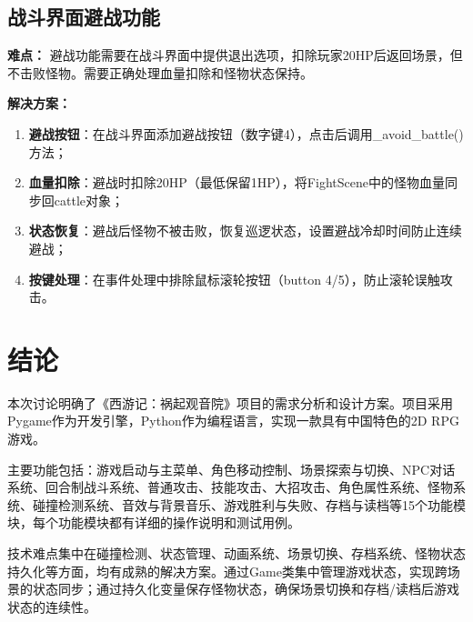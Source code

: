 \documentclass[a4paper,12pt]{article}
\begin{document}
\subsection{战斗界面避战功能}

\textbf{难点：}
避战功能需要在战斗界面中提供退出选项，扣除玩家20HP后返回场景，但不击败怪物。需要正确处理血量扣除和怪物状态保持。

\textbf{解决方案：}
\begin{enumerate}[label=(\arabic*)]
    \item \textbf{避战按钮}：在战斗界面添加避战按钮（数字键4），点击后调用\_avoid\_battle()方法；
    \item \textbf{血量扣除}：避战时扣除20HP（最低保留1HP），将FightScene中的怪物血量同步回cattle对象；
    \item \textbf{状态恢复}：避战后怪物不被击败，恢复巡逻状态，设置避战冷却时间防止连续避战；
    \item \textbf{按键处理}：在事件处理中排除鼠标滚轮按钮（button 4/5），防止滚轮误触攻击。
\end{enumerate}

\section{结论}

本次讨论明确了《西游记：祸起观音院》项目的需求分析和设计方案。项目采用Pygame作为开发引擎，Python作为编程语言，实现一款具有中国特色的2D RPG游戏。

主要功能包括：游戏启动与主菜单、角色移动控制、场景探索与切换、NPC对话系统、回合制战斗系统、普通攻击、技能攻击、大招攻击、角色属性系统、怪物系统、碰撞检测系统、音效与背景音乐、游戏胜利与失败、存档与读档等15个功能模块，每个功能模块都有详细的操作说明和测试用例。

技术难点集中在碰撞检测、状态管理、动画系统、场景切换、存档系统、怪物状态持久化等方面，均有成熟的解决方案。通过Game类集中管理游戏状态，实现跨场景的状态同步；通过持久化变量保存怪物状态，确保场景切换和存档/读档后游戏状态的连续性。
\end{document}
